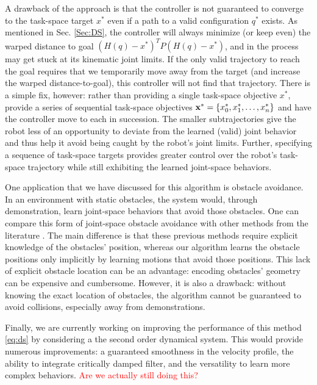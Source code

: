 \documentclass[letterpaper, 10 pt, conference,fleqn]{ieeeconf}
\begin{document}
A drawback of the approach is that the controller is not guaranteed to converge to the task-space target $x^*$ even if a path to a valid configuration $q^*$ exists. As mentioned in Sec. \ref{Sec:DS}, the controller will always minimize (or keep even) the warped distance to goal $(H(q) - x^*)^TP(H(q) - x^*)$, and in the process may get stuck at its kinematic joint limits. If the only valid trajectory to reach the goal requires that we temporarily move away from the target (and increase the warped distance-to-goal), this controller will not find that trajectory. There is a simple fix, however: rather than providing a single task-space objective $x^*$, provide a series of sequential task-space objectives $\begin{bf}x^*\end{bf} = \{ x^*_0, x^*_1, \dots, x^*_n\}$ and have the controller move to each in succession. The smaller subtrajectories give the robot less of an opportunity to deviate from the learned (valid) joint behavior and thus help it avoid being caught by the robot's joint limits. Further, specifying a sequence of task-space targets provides greater control over the robot's task-space trajectory while still exhibiting the learned joint-space behaviors.

One application that we have discussed for this algorithm is obstacle avoidance. In an environment with static obstacles, the system would, through demonstration, learn joint-space behaviors that avoid those obstacles. One can compare this form of joint-space obstacle avoidance with other methods from the literature \cite{sciavicco1988solution,petrivc2013smooth}. The main difference is that these previous methods require explicit knowledge of the obstacles' position, whereas our algorithm learns the obstacle positions only implicitly by learning motions that avoid those positions. This lack of explicit obstacle location can be an advantage: encoding obstacles' geometry can be expensive and cumbersome. However, it is also a drawback: without knowing the exact location of obstacles, the algorithm cannot be guaranteed to avoid collisions, especially away from demonstrations.

Finally, we are currently working on improving the performance of this method \eqref{eq:ds} by considering a the second order dynamical system. This would provide numerous improvements: a guaranteed smoothness in the velocity profile, the ability to integrate critically damped filter, and the versatility to learn more complex behaviors. \textcolor{red}{Are we actually still doing this?}
\appendices
\end{document}
